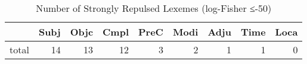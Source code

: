 \begin{table}[htbp!]
\centering
\caption{Number of Strongly Repulsed Lexemes (log-Fisher ≤-50)}
\label{table:Nrepulse}
\begin{tabular}{lrrrrrrrr}
\toprule
{} &  Subj &  Objc &  Cmpl &  PreC &  Modi &  Adju &  Time &  Loca \\
\midrule
total &    14 &    13 &    12 &     3 &     2 &     1 &     1 &     0 \\
\bottomrule
\end{tabular}
\end{table}
